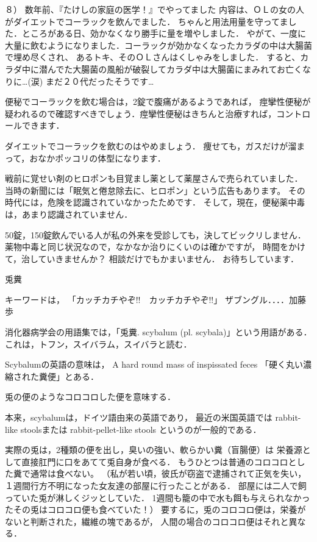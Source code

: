 ８） 数年前、『たけしの家庭の医学！』でやってました
内容は、ＯＬの女の人がダイエットでコーラックを飲んでました．
ちゃんと用法用量を守ってました．ところがある日、効かなくなり勝手に量を増やしました．
やがて、一度に大量に飲むようになりました．コーラックが効かなくなったカラダの中は大腸菌で埋め尽くされ、
あるトキ、そのＯＬさんはくしゃみをしました．
すると、カラダ中に潜んでた大腸菌の風船が破裂してカラダ中は大腸菌にまみれてお亡くなりに…(涙)
まだ２０代だったそうです… 

便秘でコーラックを飲む場合は，2錠で腹痛があるようであれば，
痙攣性便秘が疑われるので確認すべきでしょう．痙攣性便秘はきちんと治療すれば，コントロールできます．

ダイエットでコーラックを飲むのはやめましょう．
痩せても，ガスだけが溜まって，おなかポッコリの体型になります．

戦前に覚せい剤のヒロポンも目覚まし薬として薬屋さんで売られていました．
当時の新聞には「眠気と倦怠除去に、ヒロポン」という広告もあります。
その時代には，危険を認識されていなかったためです．
そして，現在，便秘薬中毒は，あまり認識されていません．

50錠，150錠飲んでいる人が私の外来を受診しても，決してビックリしません．
薬物中毒と同じ状況なので，なかなか治りにくいのは確かですが，
時間をかけて，治していきませんか？
相談だけでもかまいません．
お待ちしています．

兎糞

キーワードは，
「カッチカチやぞ!!　カッチカチやぞ!!」
ザブングル．．．．加藤歩 


消化器病学会の用語集では，「兎糞. scybalum (pl. scybala)」という用語がある．
これは，トフン，スイバラム，スイバラと読む． 


Scybalumの英語の意味は，
A hard round mass of inspissated feces
「硬く丸い濃縮された糞便」とある．

兎の便のようなコロコロした便を意味する．


本来，scybalumは，ドイツ語由来の英語であり，
最近の米国英語では
rabbit-like stoolsまたは rabbit-pellet-like stools
というのが一般的である．

実際の兎は，2種類の便を出し，臭いの強い、軟らかい糞（盲腸便）は
栄養源として直接肛門に口をあてて兎自身が食べる．
もうひとつは普通のコロコロとした糞で通常は食べない。
（私が若い頃，彼氏が窃盗で逮捕されて正気を失い，
１週間行方不明になった女友達の部屋に行ったことがある．
部屋には二人で飼っていた兎が淋しくジッとしていた．
1週間も籠の中で水も餌も与えられなかったその兎はコロコロ便も食べていた！）
要するに，兎のコロコロ便は，栄養がないと判断された，繊維の塊であるが，
人間の場合のコロコロ便はそれと異なる．


